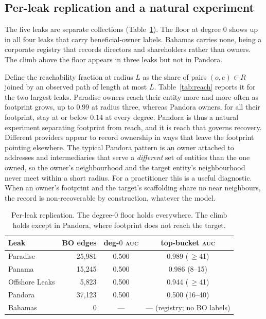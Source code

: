 \documentclass[sigconf]{acmart}
\begin{document}
\subsection{Per-leak replication and a natural experiment}
The five leaks are separate collections (Table~\ref{tab:perleak}). The floor at
degree $0$ shows up in all four leaks that carry beneficial-owner labels. Bahamas
carries none, being a corporate registry that records directors and shareholders
rather than owners. The climb above the floor appears in three leaks but not in
Pandora.

Define the reachability fraction at radius $L$ as the share of pairs
$(o,e)\in R$ joined by an observed path of length at most $L$.
Table~\ref{tab:reach} reports it for the two largest leaks. Paradise owners reach
their entity more and more often as footprint grows, up to $0.99$ at radius three,
whereas Pandora owners, for all their footprint, stay at or below $0.14$ at every
degree. Pandora is thus a natural experiment separating footprint from reach, and
it is reach that governs recovery. Different providers appear to record ownership
in ways that leave the footprint pointing elsewhere. The typical Pandora pattern
is an owner attached to addresses and intermediaries that serve a \emph{different}
set of entities than the one owned, so the owner's neighbourhood and the target
entity's neighbourhood never meet within a short radius. For a practitioner this
is a useful diagnostic. When an owner's footprint and the target's scaffolding
share no near neighbours, the record is non-recoverable by construction, whatever
the model.

\begin{table}[t]
\caption{Per-leak replication. The degree-$0$ floor holds everywhere. The climb
holds except in Pandora, where footprint does not reach the target.}
\label{tab:perleak}
\small
\begin{tabular}{@{}lrcc@{}}
\toprule
\textbf{Leak} & \textbf{BO edges} & \textbf{deg-$0$ \textsc{auc}} & \textbf{top-bucket \textsc{auc}}\\
\midrule
Paradise       & 25{,}981 & 0.500 & 0.989 (\,$\ge$41)\\
Panama         & 15{,}245 & 0.500 & 0.986 (8--15)\\
Offshore Leaks &  5{,}823 & 0.500 & 0.944 (\,$\ge$41)\\
Pandora        & 37{,}123 & 0.500 & 0.500 (16--40)\\
Bahamas        &        0 & --- & --- (registry; no BO labels)\\
\bottomrule
\end{tabular}
\end{table}
\end{document}
